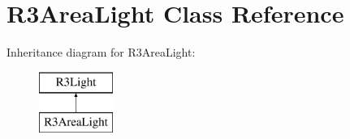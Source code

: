 \hypertarget{class_r3_area_light}{}\section{R3\+Area\+Light Class Reference}
\label{class_r3_area_light}
Inheritance diagram for R3\+Area\+Light\+:\begin{figure}[H]
\begin{center}
\leavevmode
\includegraphics[height=2.000000cm]{class_r3_area_light}
\end{center}
\end{figure}
